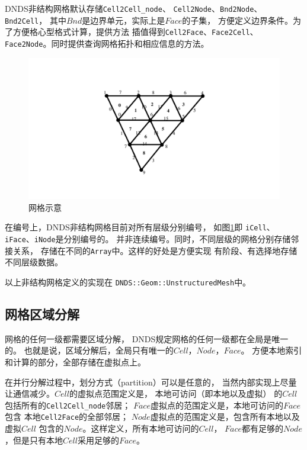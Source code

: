\documentclass[UTF8,zihao=5]{ctexart} %
\begin{document}
DNDS非结构网格默认存储\verb|Cell2Cell_node|、
\verb|Cell2Node|、\verb|Bnd2Node|、\verb|Bnd2Cell|，
其中$Bnd$是边界单元，实际上是$Face$的子集，
方便定义边界条件。为了方便格心型格式计算，提供方法
插值得到\verb|Cell2Face|、\verb|Face2Cell|、
\verb|Face2Node|。同时提供查询网格拓扑和相应信息的方法。

\begin{figure}[htbp]
    \centering
    \includegraphics[width=12cm]{mesh_A.pdf} 
    \caption{网格示意}
    \label{fig:mesh_A}
\end{figure}

在编号上，DNDS非结构网格目前对所有层级分别编号，
如图\ref{fig:mesh_A}即
\verb|iCell|、\verb|iFace|、\verb|iNode|是分别编号的。
并非连续编号。同时，不同层级的网格分别存储邻接关系，
存储在不同的\verb|Array|中。这样的好处是方便实现
有阶段、有选择地存储不同层级数据。


以上非结构网格定义的实现在
\verb|DNDS::Geom::UnstructuredMesh|中。

\subsection{网格区域分解}



网格的任何一级都需要区域分解，
DNDS规定网格的任何一级都在全局是唯一的。
也就是说，区域分解后，全局只有唯一的$Cell$，$Node$，$Face$。
方便本地索引和计算的部分，全部存储在虚拟点上。

在并行分解过程中，划分方式（partition）可以是任意的，
当然内部实现上尽量让通信减少。$Cell$的虚拟点范围定义是，
本地可访问（即本地以及虚拟）
的$Cell$包括所有的\verb|Cell2Cell_node|邻居；
$Face$虚拟点的范围定义是，本地可访问的$Face$包含
本地\verb|Cell2Face|的全部邻居；
$Node$虚拟点的范围定义是，包含所有本地以及虚拟$Cell$
包含的$Node$。这样定义，所有本地可访问的$Cell$，
$Face$都有足够的$Node$，但是只有本地$Cell$采用足够的$Face$。
\end{document}
